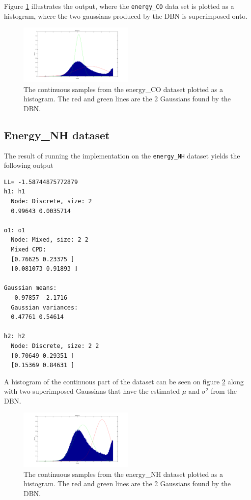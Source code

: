 \documentclass[10pt, journal, compsoc, a4paper]{IEEEtran}
\begin{document}
Figure \ref{fig4} illustrates the output, where the \texttt{energy\_CO} data set is plotted as a histogram, where the two gaussians produced by the DBN is superimposed onto. 

\begin{figure}[ht]
\centering
\includegraphics[width=0.5\textwidth]{figures/fig4.png}
\caption{The continuous samples from the energy\_CO dataset plotted as a histogram. The red and green lines are the 2 Gaussians found by the DBN.}
\label{fig4}
\end{figure}



\subsection{Energy\_NH dataset} %
\label{sub:energy_nh_dataset}
The result of running the implementation on the \texttt{energy\_NH} dataset yields the following output

\begin{verbatim}
LL= -1.58744875772879
h1: h1
  Node: Discrete, size: 2 
  0.99643 0.0035714 

o1: o1
  Node: Mixed, size: 2 2 
  Mixed CPD: 
  [0.76625 0.23375 ]
  [0.081073 0.91893 ]

Gaussian means: 
  -0.97857 -2.1716 
  Gaussian variances: 
  0.47761 0.54614 

h2: h2
  Node: Discrete, size: 2 2 
  [0.70649 0.29351 ]
  [0.15369 0.84631 ]
\end{verbatim}

A histogram of the continuous part of the dataset can be seen on figure \ref{fig5} along with two superimposed Gaussians that have the estimated $\mu$ and $\sigma^2$ from the DBN.

\begin{figure}[ht]
\centering
\includegraphics[width=0.5\textwidth]{figures/fig5.png}
\caption{The continuous samples from the energy\_NH dataset plotted as a histogram. The red and green lines are the 2 Gaussians found by the DBN.}
\label{fig5}
\end{figure}
\end{document}
